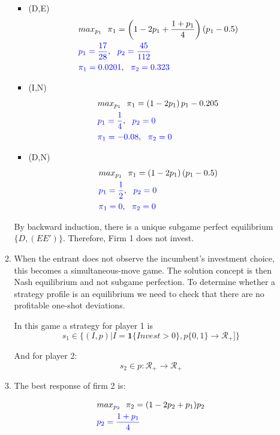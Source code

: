 \documentclass[12pt,english]{article}
\begin{document}
\begin{enumerate}
\begin{enumerate}
\begin{itemize}
\item (D,E)
\begin{align}
&max_{p_{1}}\ \ \pi_{1}=\left(1-2p_{1}+\frac{1+p_{1}}{4}\right)(p_{1}-0.5)\nonumber\\
&\textcolor{blue}{p_{1}=\frac{17}{28}}, \ \ \textcolor{blue}{p_{2}=\frac{45}{112}}\nonumber\\
& \textcolor{blue}{\pi_{1}=0.0201}, \ \ \textcolor{blue}{\pi_{2}=0.323}\nonumber
\end{align}

\item (I,N)
\begin{align}
&max_{p_{1}}\ \ \pi_{1}=\left(1-2p_{1}\right)p_{1}-0.205\nonumber\\
&\textcolor{blue}{p_{1}=\frac{1}{4}}, \ \ \textcolor{blue}{p_{2}=0}\nonumber\\
& \textcolor{blue}{\pi_{1}=-0.08}, \ \ \textcolor{blue}{\pi_{2}=0}\nonumber
\end{align}

\item (D,N)
\begin{align}
&max_{p_{1}}\ \ \pi_{1}=\left(1-2p_{1}\right)(p_{1}-0.5)\nonumber\\
&\textcolor{blue}{p_{1}=\frac{1}{2}}, \ \ \textcolor{blue}{p_{2}=0}\nonumber\\
& \textcolor{blue}{\pi_{1}=0}, \ \ \textcolor{blue}{\pi_{2}=0}\nonumber
\end{align}
\end{itemize}

By backward induction, there is a unique subgame perfect equilibrium $\{D,(EE')\}$. Therefore, Firm 1 does not invest.

\item When the entrant does not observe the incumbent's investment choice, this becomes a simultaneous-move game. The solution concept is  then Nash equilibrium and not subgame perfection. To determine whether a strategy profile is an equilibrium we need to check that there are no profitable one-shot deviations. 

In this game a strategy for player 1 is 
\[
s_{1}\in\{(I, p)| I=\mathbf{1}\{Invest>0\}, p\{0,1\}\to\mathcal{R}_{+}]\}
\]

And for player 2:
\[
s_{2}\in p:\mathcal{R}_{+}\to\mathcal{R}_{+}
\]
\item  
The best response of firm 2 is:

\begin{align}
&max_{p_{2}}\ \ \pi_{2}=(1-2p_{2}+p_{1})p_{2}\nonumber\\
&\textcolor{blue}{p_{2}=\frac{1+p_{1}}{4}}\nonumber
\end{align}


\end{enumerate}
\end{enumerate}
\end{document}
